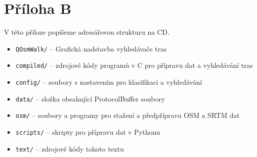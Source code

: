 \chapter*{Příloha B}
V této příloze popíšeme adresářovou strukturu na CD.
\begin{itemize}
	\item \verb|QOsmWalk/| -- Grafická nadstavba vyhledávače tras
	\item \verb|compiled/| -- zdrojové kódy programů v C pro přípravu dat a vyhledávání tras
	\item \verb|config/| -- soubory s nastavením pro klasifikaci a vyhledávání
	\item \verb|data/| -- složka obsahující ProtocolBuffer soubory
	\item \verb|osm/| -- soubory a programy pro stažení a předpřípravu OSM a SRTM dat
	\item \verb|scripts/| -- skripty pro přípravu dat v Pythonu 
	\item \verb|text/| -- zdrojové kódy tohoto textu
\end{itemize}

